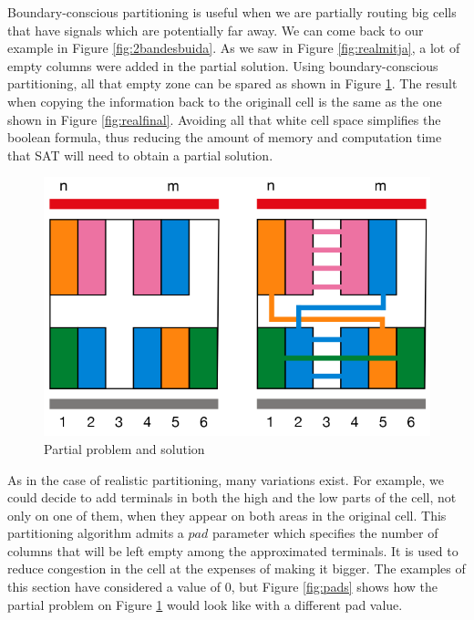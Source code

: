 Boundary-conscious partitioning is useful when we are partially routing big cells that have signals which are potentially far away. We can come back to our example in Figure \ref{fig:2bandesbuida}. As we saw in Figure \ref{fig:realmitja}, a lot of empty columns were added in the partial solution. Using boundary-conscious partitioning, all that empty zone can be spared as shown in Figure \ref{fig:Padalt}. The result when copying the information back to the originall cell is the same as the one shown in Figure \ref{fig:realfinal}. Avoiding all that white cell space simplifies the boolean formula, thus reducing the amount of memory and computation time that SAT will need to obtain a partial solution. \\

\begin{figure}[h!]
  \centering
  \includegraphics[scale=0.5]{img/design/Padalt.png}
  \caption{Partial problem and solution}
  \label{fig:Padalt}
\end{figure} 

As in the case of realistic partitioning, many variations exist. For example, we could decide to add terminals in both the high and the low parts of the cell, not only on one of them, when they appear on both areas in the original cell. This partitioning algorithm admits a $pad$ parameter which specifies the number of columns that will be left empty among the approximated terminals. It is used to reduce congestion in the cell at the expenses of making it bigger. The examples of this section have considered a value of 0, but Figure \ref{fig:pads} shows how the partial problem on Figure \ref{fig:Padalt} would look like with a different pad value. \\

